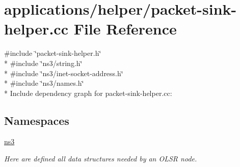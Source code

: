 \hypertarget{packet-sink-helper_8cc}{}\section{applications/helper/packet-\/sink-\/helper.cc File Reference}
\label{packet-sink-helper_8cc}
{\ttfamily \#include \char`\"{}packet-\/sink-\/helper.\+h\char`\"{}}\\*
{\ttfamily \#include \char`\"{}ns3/string.\+h\char`\"{}}\\*
{\ttfamily \#include \char`\"{}ns3/inet-\/socket-\/address.\+h\char`\"{}}\\*
{\ttfamily \#include \char`\"{}ns3/names.\+h\char`\"{}}\\*
Include dependency graph for packet-\/sink-\/helper.cc\+:
\subsection*{Namespaces}
\begin{DoxyCompactItemize}
\item 
 \hyperlink{namespacens3}{ns3}
\begin{DoxyCompactList}\small\item\em Here are defined all data structures needed by an O\+L\+SR node. \end{DoxyCompactList}\end{DoxyCompactItemize}
